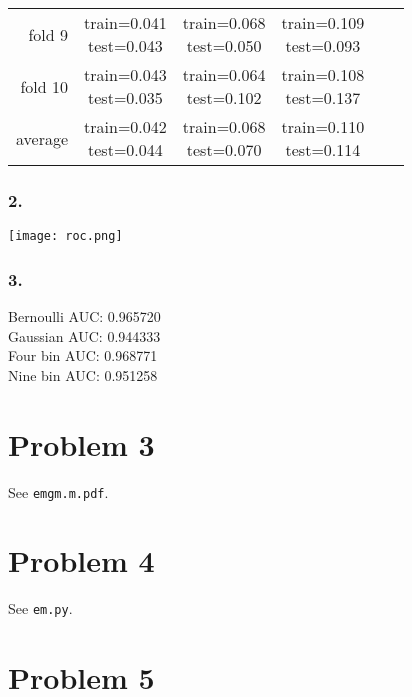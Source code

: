 \documentclass[12pt]{article}
\begin{document}
\begin{tabular}{ r|c|c|c|c|c| }
fold 9 & \shortstack{train=0.041 \\ test=0.043}& \shortstack{train=0.068 \\ test=0.050}& \shortstack{train=0.109 \\ test=0.093} \\\cline{2-4}
fold 10 & \shortstack{train=0.043 \\ test=0.035}& \shortstack{train=0.064 \\ test=0.102}& \shortstack{train=0.108 \\ test=0.137} \\\cline{2-4}
average & \shortstack{train=0.042 \\ test=0.044}& \shortstack{train=0.068 \\ test=0.070}& \shortstack{train=0.110 \\ test=0.114} \\\cline{2-4}
\end{tabular}

		\renewcommand{\arraystretch}{1}
		
		\subsubsection*{2.}
		\texttt{[image: roc.png]}
		
		\subsubsection*{3.}
		Bernoulli AUC: 0.965720 \\
		Gaussian AUC: 0.944333 \\
		Four bin AUC: 0.968771 \\
		Nine bin AUC: 0.951258\\
		
\section*{Problem 3}
See \texttt{emgm.m.pdf}.

\section*{Problem 4}
See \texttt{em.py}.

\section*{Problem 5}
\end{document}
